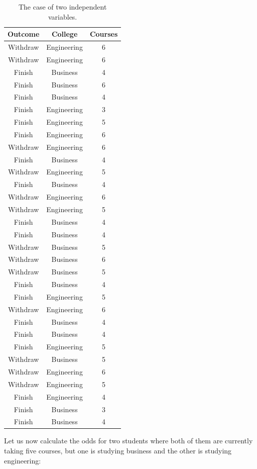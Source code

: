 \documentclass[a4paper,12pt,oneside]{book}
\begin{document}
 \begin{longtable}[c]{ c c c}
	\caption{The case of two independent variables.\label{table:multiple}}\\
		\hline
		\bf Outcome & \bf College & \bf Courses\\
		\hline
		Withdraw & Engineering & 6 \\
		Withdraw & Engineering & 6 \\
		Finish & Business & 4 \\
		Finish & Business & 6 \\
		Finish & Business & 4 \\
		Finish & Engineering & 3 \\
		Finish & Engineering & 5 \\
		Finish & Engineering & 6 \\
		Withdraw & Engineering & 6 \\
		Finish & Business & 4 \\
		Withdraw & Engineering & 5 \\
		Finish & Business & 4 \\
		Withdraw & Engineering & 6 \\
		Withdraw & Engineering & 5 \\
		Finish & Business & 4 \\
		Finish & Business & 4 \\
		Withdraw & Business & 5 \\
		Withdraw & Business & 6 \\
		Withdraw & Business & 5 \\
		Finish & Business & 4 \\
		Finish & Engineering & 5 \\
		Withdraw & Engineering & 6 \\
		Finish & Business & 4 \\
		Finish & Business & 4 \\
		Finish & Engineering & 5 \\
		Withdraw & Business & 5 \\
		Withdraw & Engineering & 6 \\
		Withdraw & Engineering & 5 \\
		Finish & Engineering & 4 \\
		Finish & Business & 3 \\
		Finish & Business & 4 \\
	\hline
\end{longtable}

Let us now calculate the odds for two students where both of them are currently taking five courses, but one is studying business and the other is studying engineering:
\end{document}

